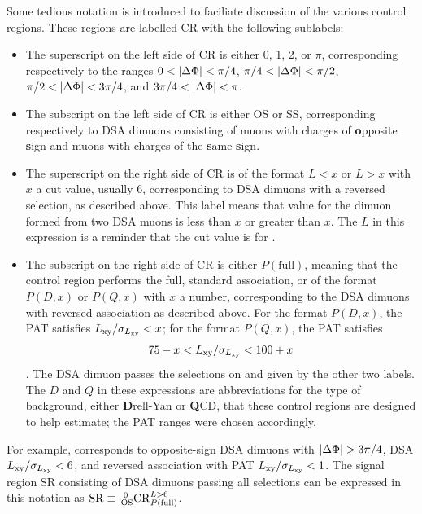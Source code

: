 Some tedious notation is introduced to faciliate discussion of the various control regions.
These regions are labelled CR with the following sublabels:
\begin{itemize}
  \item The superscript on the left side of CR is either 0, 1, 2, or $\pi$, corresponding respectively to the \DeltaPhi ranges $0 < \DeltaPhi < \pi/4$, $\pi/4 < \DeltaPhi < \pi/2$, $\pi/2 < \DeltaPhi < 3\pi/4$, and $3\pi/4 < \DeltaPhi < \pi$.
  \item The subscript on the left side of CR is either OS or SS, corresponding respectively to DSA dimuons consisting of muons with charges of \textbf{o}pposite \textbf{s}ign and muons with charges of the \textbf{s}ame \textbf{s}ign.
  \item The superscript on the right side of CR is of the format $L<x$ or $L>x$ with $x$ a cut value, usually 6, corresponding to DSA dimuons with a reversed \LxySig selection, as described above. This label means that \LxySig value for the dimuon formed from two DSA muons is less than $x$ or greater than $x$. The $L$ in this expression is a reminder that the cut value is for \LxySig.
  \item The subscript on the right side of CR is either $P(\mathrm{full})$, meaning that the control region performs the full, standard \DSAToPAT association, or of the format $P(D,x)$ or $P(Q,x)$ with $x$ a number, corresponding to the DSA dimuons with reversed \DSAToPAT association as described above. For the format $P(D,x)$, the PAT \LxySig satisfies $\LxySig < x$; for the format $P(Q,x)$, the PAT \LxySig satisfies $$75 - x < \LxySig < 100+x$$. The DSA dimuon passes the selections on \DeltaPhi and \LxySig given by the other two labels. The $D$ and $Q$ in these expressions are abbreviations for the type of background, either \textbf{D}rell-Yan or \textbf{Q}CD, that these control regions are designed to help estimate; the PAT \LxySig ranges were chosen accordingly.
\end{itemize}
For example,  corresponds to opposite-sign DSA dimuons with \mbox{$\DeltaPhi > 3\pi/4$}, DSA $\LxySig < 6$, and reversed \DSAToPAT association with PAT $\LxySig < 1$.
The signal region SR consisting of DSA dimuons passing all selections can be expressed in this notation as $\mathrm{SR} \equiv\, \CR[OS]{\Full}{>6}{0}$.

